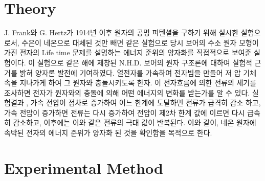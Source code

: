 \documentclass[a4paper, 10pt, nanum]{CSUniSchoolLabReport}
\begin{document}

\section{Theory}


  J. Frank와 G. Hertz가 1914년 이후 원자의 공명 퍼텐셜을 구하기 위해 실시한 실험으로서, 수은이 네온으로 대체된 것만 빼면 같은 실험으로 당시 보어의 수소 원자 모형이 가진 전자의 Life time 문제를 설명하는 에너지 준위의 양자화를 직접적으로 보여준 실험이다. 이 실험으로 같은 해에 제창된 N.H.D. 보어의 원자 구조론에 대하여 실험적 근거를 밝혀 양자론 발전에 기여하였다. 열전자를 가속하여 전자빔을 만들어 저
  압 기체 속을 지나가게 하여 그 원자와 충돌시키도록 한자. 이 전자흐름에 의한 전류의 세기를 조사하면 전자가 원자와의 충돌에 의해 어떤 에너지의 변화를 받는가를 알 수 있다. 실험결과 , 가속 전압이 점차로 증가하여 어느 한계에 도달하면 전류가 급격히 감소
  하고, 가속 전압이 증가하면 전류는 다시 증가하여 전압이 제2차 한계 값에 이르면 다시 급속히 감소하고, 이후에는 이와 같은 전류의 극대 값이 반복된다. 이와 같이, 네온 원자에 속박된 전자의 에너지 준위가 양자화 된 것을 확인함을 목적으로 한다.


\section{Experimental Method}

\end{document}
